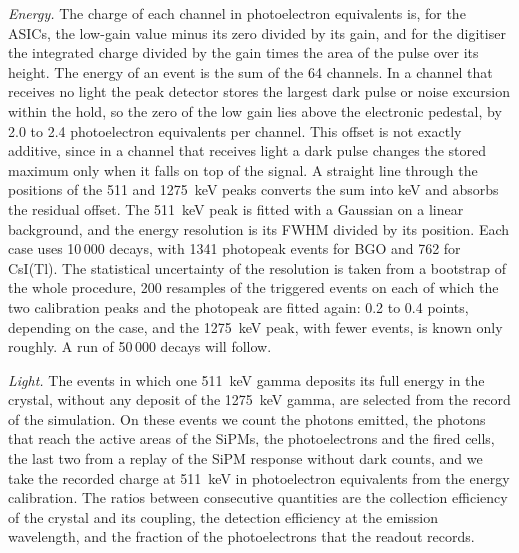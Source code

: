 \documentclass[11pt]{article}
\newcommand{\csitl}{CsI(Tl)\xspace}
\begin{document}
\emph{Energy.} The charge of each channel in photoelectron equivalents is,
for the ASICs, the low-gain value minus its zero divided by its gain, and
for the digitiser the integrated charge divided by the gain times the area
of the pulse over its height. The energy of an event is the sum of the 64
channels. In a channel that receives no light the peak detector stores the
largest dark pulse or noise excursion within the hold, so the zero of the
low gain lies above the electronic pedestal, by 2.0 to 2.4 photoelectron
equivalents per channel. This offset is not exactly additive, since in a
channel that receives light a dark pulse changes the stored maximum only
when it falls on top of the signal. A straight line through the positions
of the 511 and 1275~keV peaks converts the sum into keV and absorbs the
residual offset. The 511~keV peak is fitted with a Gaussian on a linear
background, and the energy resolution is its FWHM divided by its
position. Each case uses 10\,000 decays, with 1341 photopeak events for
BGO and 762 for \csitl. The statistical uncertainty of the resolution is
taken from a bootstrap of the whole procedure, 200 resamples of the
triggered events on each of which the two calibration peaks and the
photopeak are fitted again: 0.2 to 0.4 points, depending on the case, and
the 1275~keV peak, with fewer events, is known only roughly. A run of
50\,000 decays will follow.

\emph{Light.} The events in which one 511~keV gamma deposits its full
energy in the crystal, without any deposit of the 1275~keV gamma, are
selected from the record of the simulation. On these events we count the photons emitted, the
photons that reach the active areas of the SiPMs, the photoelectrons and
the fired cells, the last two from a replay of the SiPM response without
dark counts, and we take the recorded charge at 511~keV in photoelectron
equivalents from the energy calibration. The ratios between consecutive
quantities are the collection efficiency of the crystal and its coupling,
the detection efficiency at the emission wavelength, and the
fraction of the photoelectrons that the readout records.
\end{document}
